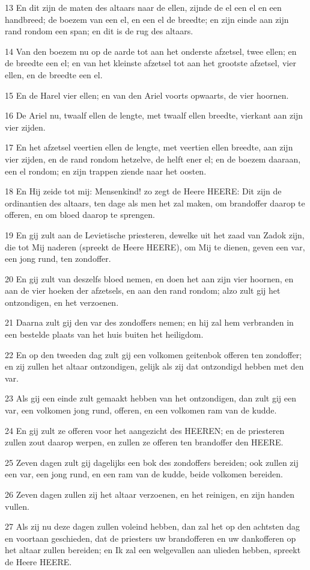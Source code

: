 \par 13 En dit zijn de maten des altaars naar de ellen, zijnde de el een el en een handbreed; de boezem van een el, en een el de breedte; en zijn einde aan zijn rand rondom een span; en dit is de rug des altaars.
\par 14 Van den boezem nu op de aarde tot aan het onderste afzetsel, twee ellen; en de breedte een el; en van het kleinste afzetsel tot aan het grootste afzetsel, vier ellen, en de breedte een el.
\par 15 En de Harel vier ellen; en van den Ariel voorts opwaarts, de vier hoornen.
\par 16 De Ariel nu, twaalf ellen de lengte, met twaalf ellen breedte, vierkant aan zijn vier zijden.
\par 17 En het afzetsel veertien ellen de lengte, met veertien ellen breedte, aan zijn vier zijden, en de rand rondom hetzelve, de helft ener el; en de boezem daaraan, een el rondom; en zijn trappen ziende naar het oosten.
\par 18 En Hij zeide tot mij: Mensenkind! zo zegt de Heere HEERE: Dit zijn de ordinantien des altaars, ten dage als men het zal maken, om brandoffer daarop te offeren, en om bloed daarop te sprengen.
\par 19 En gij zult aan de Levietische priesteren, dewelke uit het zaad van Zadok zijn, die tot Mij naderen (spreekt de Heere HEERE), om Mij te dienen, geven een var, een jong rund, ten zondoffer.
\par 20 En gij zult van deszelfs bloed nemen, en doen het aan zijn vier hoornen, en aan de vier hoeken der afzetsels, en aan den rand rondom; alzo zult gij het ontzondigen, en het verzoenen.
\par 21 Daarna zult gij den var des zondoffers nemen; en hij zal hem verbranden in een bestelde plaats van het huis buiten het heiligdom.
\par 22 En op den tweeden dag zult gij een volkomen geitenbok offeren ten zondoffer; en zij zullen het altaar ontzondigen, gelijk als zij dat ontzondigd hebben met den var.
\par 23 Als gij een einde zult gemaakt hebben van het ontzondigen, dan zult gij een var, een volkomen jong rund, offeren, en een volkomen ram van de kudde.
\par 24 En gij zult ze offeren voor het aangezicht des HEEREN; en de priesteren zullen zout daarop werpen, en zullen ze offeren ten brandoffer den HEERE.
\par 25 Zeven dagen zult gij dagelijks een bok des zondoffers bereiden; ook zullen zij een var, een jong rund, en een ram van de kudde, beide volkomen bereiden.
\par 26 Zeven dagen zullen zij het altaar verzoenen, en het reinigen, en zijn handen vullen.
\par 27 Als zij nu deze dagen zullen voleind hebben, dan zal het op den achtsten dag en voortaan geschieden, dat de priesters uw brandofferen en uw dankofferen op het altaar zullen bereiden; en Ik zal een welgevallen aan ulieden hebben, spreekt de Heere HEERE.

